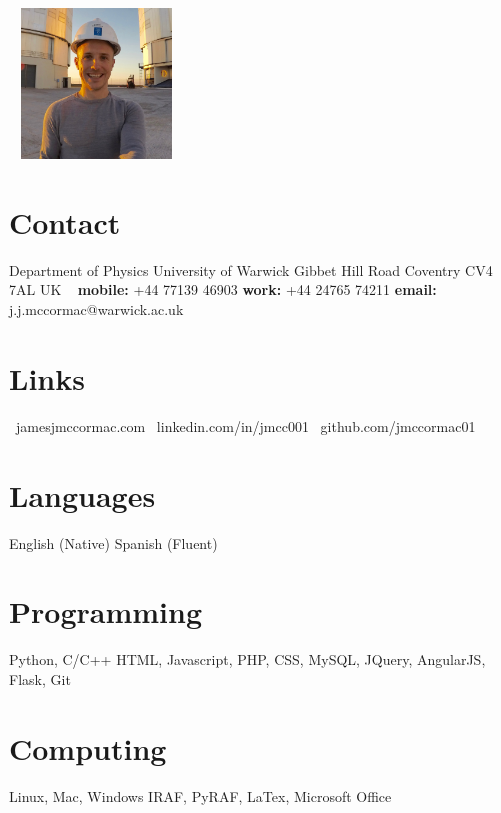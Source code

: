 \documentclass[print]{friggeri-cv} %
\begin{document}


\begin{aside} %
\vspace{0.35cm}~
\includegraphics[width=4.0cm]{CV_Photo.jpg}
~
\section{Contact}
Department of Physics
University of Warwick
Gibbet Hill Road
Coventry
CV4 7AL
UK
~
{\bf mobile:} 
+44 77139 46903
{\bf work:} 
+44 24765 74211
{\bf email:}
{\small j.j.mccormac@warwick.ac.uk}
~
\section{Links}
{\small \faGlobe~jamesjmccormac.com}
{\small \faLinkedin~linkedin.com/in/jmcc001}
{\small \faGithub~github.com/jmccormac01}
~
\section{Languages}
English (Native)
Spanish (Fluent)
\section{Programming}
Python, C/C++
HTML, Javascript, 
PHP, CSS, MySQL,  
JQuery, AngularJS,
Flask, Git
\section{Computing}
Linux, Mac, Windows
IRAF, PyRAF, LaTex,
Microsoft Office
\end{aside}

\end{document}
